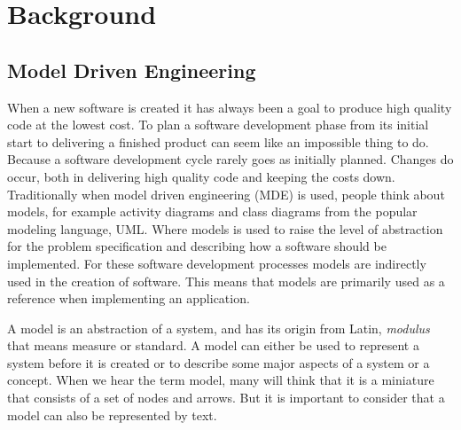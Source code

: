 
\chapter{Background} %

\label{Chapter2} %



\section{Model Driven Engineering}

When a new software is created it has always been a goal to produce high
quality code at the lowest cost. To plan a software development phase from its
initial start to delivering a finished product can seem like an impossible
thing to do. Because a software development cycle rarely goes as initially
planned. Changes do occur, both in delivering high quality code and keeping the
costs down. Traditionally when model driven engineering (MDE) is used, people
think about models, for example activity diagrams and class diagrams from the
popular modeling language, UML. Where models is used to raise the level
of abstraction for the problem specification and describing how a software
should be implemented. For these software development processes models are
indirectly used in the creation of software. This means that models are
primarily used as a reference when implementing an application.

A model is an abstraction of a system, and has its origin from Latin,
\textit{modulus} that means measure or standard. A model can either be used to
represent a system before it is created or to describe some major aspects of a
system or a concept. When we hear the term model, many will think that it
is a miniature that consists of a set of nodes and arrows. But it is important
to consider that a model can also be represented by text. 

